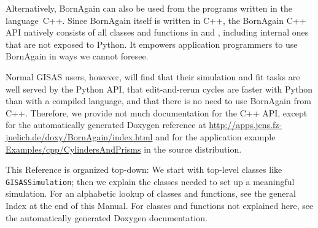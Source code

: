 Alternatively, BornAgain can also be used from the programs written
in the language~C++.
Since BornAgain itself is written in C++,
%
the BornAgain C++ API natively consists of
all classes and functions in  and ,
%
%
including internal ones that are not exposed to Python.
It empowers application programmers to use BornAgain
in ways we cannot foresee.

Normal GISAS users, however, will find that their simulation and fit tasks
are well served by the Python API,
that edit-and-rerun cycles are faster with Python than with a compiled language,
and that there is no need to use BornAgain from C++.
Therefore, we provide not much documentation for the C++ API,
except for the automatically generated Doxygen reference at
\url{http://apps.jcns.fz-juelich.de/doxy/BornAgain/index.html} and
for the application example \url{Examples/cpp/CylindersAndPrisms}
in the source distribution.

\bigskip
This Reference is organized top-down: We start with top-level classes like
\texttt{GISAS\-Simulation};
then we explain the classes needed to set up a meaningful simulation.
For an alphabetic lookup of classes and functions,
see the general Index at the end of this Manual.
For classes and functions not explained here,
see the automatically generated Doxygen documentation.



